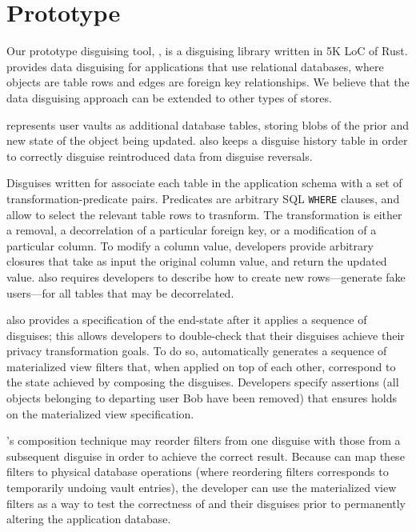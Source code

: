 \section{Prototype}
\label{sec:proto}
%
Our prototype disguising tool, \sys, is a disguising library written in 5K LoC of Rust.
%
\sys provides data disguising for applications that use relational databases, where
objects are table rows and edges are foreign key relationships.
%
We believe that the data disguising approach can be extended to other types of stores.
%

%
\sys represents user vaults as additional database tables, storing blobs of the prior and new state
of the object being updated. \sys also keeps a disguise history table in order to correctly 
disguise reintroduced data from disguise reversals.
%

%
Disguises written for \sys associate each table in the application schema with a set of
transformation-predicate pairs. Predicates are arbitrary SQL \texttt{WHERE} clauses, and allow \sys
to select the relevant table rows to trasnform. The
transformation is either a removal, a decorrelation of a particular foreign key, or a
modification of a particular column. To modify a column value, developers provide arbitrary closures that take as input the original column value, and return the updated value.
%
\sys also requires developers to describe how to create new rows---\eg generate fake users---for all
tables that may be decorrelated.

\sys also provides a specification of the end-state after it applies a sequence of
disguises; this allows developers to double-check that their disguises achieve their privacy
transformation goals.
%
To do so, \sys automatically generates a sequence of materialized view filters that, when applied on top of each
other, correspond to the state achieved by composing the disguises. 
Developers specify assertions (\eg all objects belonging to departing user Bob have
been removed) that \sys ensures holds on the materialized view specification.

\sys's composition technique may reorder filters from one disguise with those from a subsequent disguise in order to achieve the
correct result.
%
Because \sys can map these filters to physical database operations (where reordering filters corresponds to
temporarily undoing vault entries), the developer can use the materialized view filters as a way to
test the correctness of \sys and their disguises prior to permanently altering the application database. 
